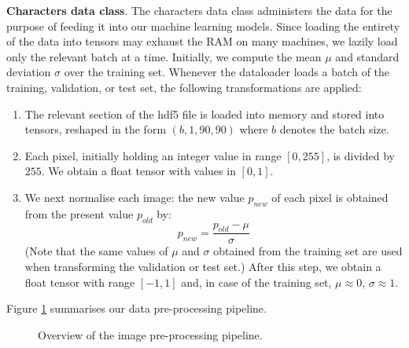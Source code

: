 \documentclass[british,12p]{article}
\begin{document}
    	
    	\textbf{Characters data class}. The characters data class administers the data for the purpose of feeding it into our machine learning models. Since loading the entirety of the data into tensors may exhaust the RAM on many machines, we lazily load only the relevant batch at a time. Initially, we compute the mean $\mu$ and standard deviation $\sigma$ over the training set. Whenever the dataloader loads a batch of the training, validation, or test set, the following transformations are applied:
    	\begin{enumerate}
    		\item The relevant section of the hdf5 file is loaded into memory and stored into tensors, reshaped in the form $(b, 1, 90, 90)$ where $b$ denotes the batch size.
    		\item Each pixel, initially holding an integer value in range $[0, 255]$, is divided by $255$. We obtain a float tensor with values in $[0, 1]$.
    		\item We next normalise each image: the new value $p_{new}$ of each pixel is obtained from the present value $p_{old}$ by: $$ p_{new} = \frac{p_{old} - \mu}{\sigma}$$ (Note that the same values of $\mu$ and $\sigma$  obtained from the training set are used when transforming the validation or test set.) After this step, we obtain a float tensor with range $[-1, 1]$ and, in case of the training set, $\mu \approx 0$, $\sigma \approx 1$. 
    	\end{enumerate}
    	
    	Figure \ref{fig-preprocessing} summarises our data pre-processing pipeline. 
    	
    	\begin{figure}[h!]
			\begin{center}
  				\caption{Overview of the image pre-processing pipeline.}
  				\label{fig-preprocessing}
  			\end{center}
		\end{figure}
    	
    	
\end{document}
